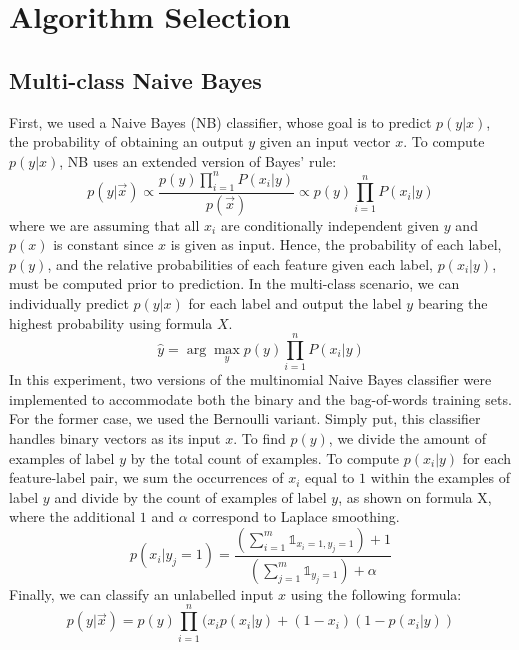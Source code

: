 \documentclass{acm_proc_article-sp}
\begin{document}
\section{Algorithm Selection}
\subsection{Multi-class Naive Bayes}
First, we used a Naive Bayes (NB) classifier, whose goal is to predict $p(y|x)$, the probability of obtaining an output $y$ given an input vector $x$. To compute $p(y|x)$, NB uses an extended version of Bayes' rule:
\begin{equation}
 p(y| \overrightarrow{x}) \propto \frac{p(y) \prod_{i=1}^n P(x_i | y)}{ p (\overrightarrow{x}) }   \propto p(y) \prod_{i=1}^n P(x_i | y) \label{eq:nb1}
\end{equation}
where we are assuming that all $x_i$ are conditionally independent given $y$ and $p(x)$ is constant since $x$ is given as input. Hence, the probability of each label, $p(y)$, and the relative probabilities of each feature given each label, $p(x_i|y)$, must be computed prior to prediction. In the multi-class scenario, we can individually predict $p(y|x)$ for each label and output the label $y$ bearing the highest probability using formula $X$.
\begin{equation}
 \hat{y} = \arg\max_y p (y) \prod_{i=1}^n P(x_i | y) \label{eq:nb2}
\end{equation}
In this experiment, two versions of the multinomial Naive Bayes classifier were implemented to accommodate both the binary and the bag-of-words training sets. For the former case, we used the Bernoulli variant. Simply put, this classifier handles binary vectors as its input $x$. To find $p(y)$, we divide the amount of examples of label $y$ by the total count of examples. To compute $p(x_i|y)$ for each feature-label pair, we sum the occurrences of $x_i$ equal to $1$ within the examples of label $y$ and divide by the count of examples of label $y$, as shown on formula X, where the additional $1$ and $\alpha$ correspond to Laplace smoothing. 
\begin{equation}
p(x_i | y_j=1) = \frac{(\sum_{i=1}^m \mathds{1}_{x_i=1, y_j=1})+1}{(\sum_{j=1}^m \mathds{1}_{y_j=1}) + \alpha} \label{eq:nb3}
\end{equation}
Finally, we can classify an unlabelled input $x$ using the following formula:
\begin{equation}
p(y|\overrightarrow{x}) = p(y) \prod_{i=1}^n (x_i p(x_i | y) + (1 - x_i) (1 - p(x_i | y)) \label{eq:nb4}
\end{equation}
\end{document}
